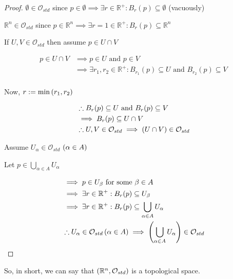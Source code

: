 \begin{proof}
    $ \emptyset \in \mathcal{O}_{std}$ since $ p \in \emptyset \implies \exists r \in \mathbb{R}^+ : B_r(p) \subseteq \emptyset$ (vacuously)

    $ \mathbb{R}^n \in \mathcal{O}_{std}$ since $ p \in \mathbb{R}^n \implies \exists r = 1 \in \mathbb{R}^+ : B_r(p) \subseteq \mathbb{R}^n$

    If $ U, V \in \mathcal{O}_{std}$ then assume $ p \in U \cap V$

    \begin{align*}
        p \in U \cap V &\implies p \in U \text{ and } p \in V \\
        &\implies \exists r_1, r_2 \in \mathbb{R}^+ : B_{r_1}(p) \subseteq U \text{ and } B_{r_2}(p) \subseteq V \\
    \end{align*}

    Now, $ r := \min \left(  r_1, r_2 \right)$

    \begin{align*}
        & \therefore B_r(p) \subseteq U \text{ and } B_r(p) \subseteq V \\
        & \implies B_r(p) \subseteq U \cap V \\
        & \therefore U, V \in \mathcal{O}_{std} \implies \left(  U \cap V \right) \in \mathcal{O}_{std} \\
    \end{align*}

    Assume $ U_\alpha \in \mathcal{O}_{std}$ $ \left(  \alpha \in A \right)$

    Let $ p \in \bigcup_{\alpha \in A} U_\alpha$

    \begin{align*}
        & \implies p \in U_\beta \text{ for some } \beta \in A \\
        & \implies \exists r \in \mathbb{R}^+ : B_r(p) \subseteq U_\beta \\
        & \implies \exists r \in \mathbb{R}^+ : B_r(p) \subseteq \bigcup_{\alpha \in A} U_\alpha \\
        & \therefore U_\alpha \in \mathcal{O}_{std} \left(  \alpha \in A \right) \implies \left(  \bigcup_{\alpha \in A} U_\alpha \right) \in \mathcal{O}_{std} \\
    \end{align*}
\end{proof}

So, in short, we can say that $ \left(  \mathbb{R}^n, \mathcal{O}_{std} \right)$ is a topological space.

